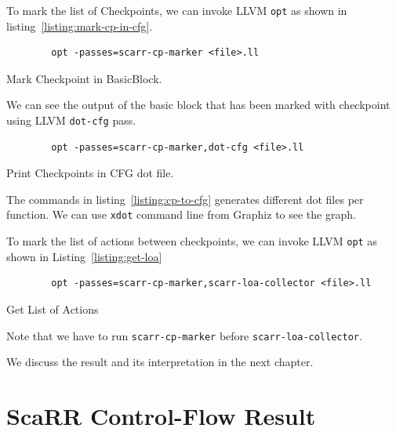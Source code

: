 To mark the list of Checkpoints, we can invoke LLVM \texttt{opt} as shown in
listing~\ref{listing:mark-cp-in-cfg}.

\begin{listing}[ht]
    \begin{verbatim}
        opt -passes=scarr-cp-marker <file>.ll
    \end{verbatim}
    \caption{Mark Checkpoint in BasicBlock.}    
    \label{listing:mark-cp-in-cfg}
\end{listing}

We can see the output of the basic block that has been marked with checkpoint using
LLVM \texttt{dot-cfg} pass.

\begin{listing}[ht]
    \begin{verbatim}
        opt -passes=scarr-cp-marker,dot-cfg <file>.ll
    \end{verbatim}
    \caption{Print Checkpoints in CFG dot file.}    
    \label{listing:cp-to-cfg}
\end{listing}

The commands in listing~\ref{listing:cp-to-cfg} generates different dot files
per function. We can use \texttt{xdot} command line from Graphiz to see the
graph. 

To mark the list of actions between checkpoints, we can invoke LLVM \texttt{opt}
as shown in Listing~\ref{listing:get-loa}

\begin{listing}[ht]
    \begin{verbatim}
        opt -passes=scarr-cp-marker,scarr-loa-collector <file>.ll
    \end{verbatim}
    \caption{Get List of Actions}    
    \label{listing:get-loa}
\end{listing}

Note that we have to run \texttt{scarr-cp-marker} before
\texttt{scarr-loa-collector}.

We discuss the result and its interpretation in the next chapter.


\section{ScaRR Control-Flow Result}

